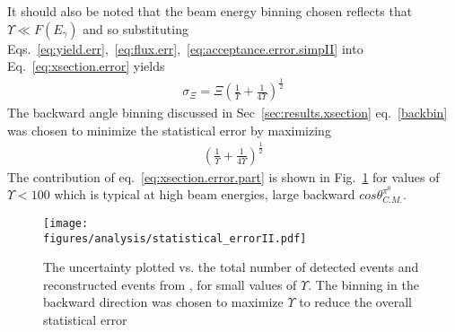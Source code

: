 It should also be noted that the beam energy binning chosen reflects that $\Upsilon \ll F(E_\gamma)$ and so substituting Eqs.~\ref{eq:yield.err},~\ref{eq:flux.err},~\ref{eq:acceptance.error.simpII} into Eq.~\ref{eq:xsection.error} yields
\begin{align}
\sigma_\varXi = \varXi \left(\frac{1}{\Upsilon} +\frac{1}{4\Upsilon}\right)^{\frac{1}{2}}\label{eq:xsection.error.part1}
\end{align}
The backward angle binning discussed in Sec~\ref{sec:results.xsection} eq.~\ref{backbin} was chosen to minimize the statistical error by maximizing 
\begin{align}
\left(\frac{1}{\Upsilon} +\frac{1}{4\Upsilon}\right)^{\frac{1}{2}}\label{eq:xsection.error.part}
\end{align}
The contribution of eq.~\ref{eq:xsection.error.part} is shown in Fig.~\ref{fig:results.staterr} for values of $\Upsilon < 100$ which is typical at high beam energies, large backward $cos\theta^{\pi^0}_{C.M.}$.

\begin{figure}[h!]\begin{center}
\texttt{[image: \\figures/analysis/statistical\_errorII.pdf]}
\caption[The uncertainty plotted vs. the total number of detected events and reconstructed events from , for small values of $\Upsilon$]{\label{fig:results.staterr}The uncertainty plotted vs. the total number of detected events and reconstructed events from , for small values of $\Upsilon$. The binning in the backward direction was chosen to maximize $\Upsilon$ to reduce the overall statistical error }
\end{center}\end{figure}

\FloatBarrier